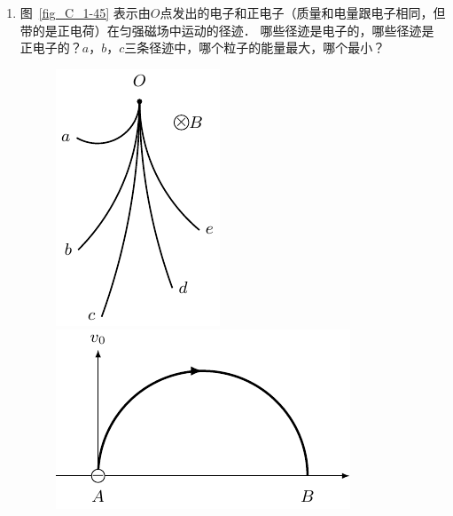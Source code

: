 \begin{enumerate}
\item 图~\ref{fig_C_1-45} 表示由$O$点发出的电子和正电子（质量和电量跟电子相同，但带的是正电荷）在匀强磁场中运动的径迹．
哪些径迹是电子的，哪些径迹是正电子的？$a$，$b$，$c$三条径迹中，哪个粒子的能量最大，哪个最小？

\begin{figure}[htbp]
	\centering
	\begin{minipage}[t]{0.48\textwidth}
		\centering
		\includegraphics{fig/C/1-45.pdf}
		\caption{}\label{fig_C_1-45}
	\end{minipage}
	\begin{minipage}[t]{0.48\textwidth}
		\centering
		\includegraphics{fig/C/1-46.pdf}
		\caption{}\label{fig_C_1-46}
	\end{minipage}
\end{figure}



\end{enumerate}
